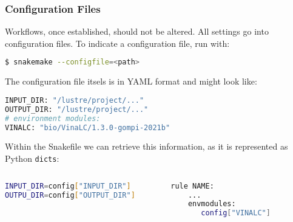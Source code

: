 \begin{frame}[fragile]
  \frametitle{Configuration Files}
  Workflows, once established, should not be altered. All settings go into configuration files. To indicate a configuration file, run with:
  \begin{lstlisting}[language=Bash,style=Shell]
$ snakemake --configfile=<path>
  \end{lstlisting}\pause
  The configuration file itsels is in YAML format and might look like:
  \begin{lstlisting}[language=Python,style=Python]
INPUT_DIR: "/lustre/project/..."
OUTPUT_DIR: "/lustre/project/..."
# environment modules:
VINALC: "bio/VinaLC/1.3.0-gompi-2021b"
  \end{lstlisting}\pause
    Within the Snakefile we can retrieve this information, as it is represented as Python \texttt{dicts}:
  \begin{columns}
     \begin{column}{0.5\textwidth}
       \begin{lstlisting}[language=Bash,style=Shell,basicstyle=\small]
INPUT_DIR=config["INPUT_DIR"]
OUTPU_DIR=config["OUTPUT_DIR"]
       \end{lstlisting}
     \end{column}
     \begin{column}{0.5\textwidth}
      \begin{lstlisting}[language=Bash,style=Shell,basicstyle=\small] 
rule NAME:
    ...
    envmodules:
       config["VINALC"]    
      \end{lstlisting}

     \end{column}
  \end{columns}

\end{frame}



